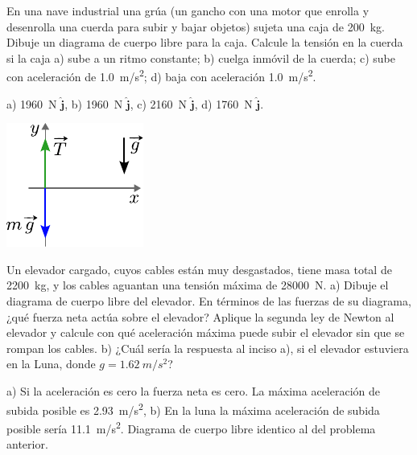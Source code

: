 \documentclass[11pt]{article}
\begin{document}
\begin{multicols}{2}
\begin{exercise}
    En una nave industrial una grúa (un gancho con una motor que enrolla y desenrolla una cuerda para subir y bajar objetos) sujeta una caja de \qty{200}{kg}. Dibuje un diagrama de cuerpo libre para la caja. Calcule la tensión en la cuerda si la caja a) sube a un ritmo constante; b) cuelga inmóvil de la cuerda; c) sube con aceleración de \qty{1.0}{m/s^2}; d) baja con aceleración \qty{1.0}{m/s^2}.
\end{exercise}
\begin{solution}
    a) \qty{1960}{N} $\hat{\bm{j}}$, b) \qty{1960}{N} $\hat{\bm{j}}$, c) \qty{2160}{N} $\hat{\bm{j}}$, d) \qty{1760}{N} $\hat{\bm{j}}$.
\begin{center}
    \includegraphics[scale=1.2]{figs/prob-06.pdf}
\end{center}
\end{solution}
\end{multicols}

\begin{multicols}{2}
\begin{exercise}
    Un elevador cargado, cuyos cables están muy desgastados, tiene masa total de \qty{2200}{kg}, y los cables aguantan una tensión máxima de \qty{28000}{N}. a) Dibuje el diagrama de cuerpo libre del elevador. En términos de las fuerzas de su diagrama, ¿qué fuerza neta actúa sobre el elevador? Aplique la segunda ley de Newton al elevador y calcule con qué aceleración máxima puede subir el elevador sin que se rompan los cables. b) ¿Cuál sería la respuesta al inciso a), si el elevador estuviera en la Luna, donde $g = \qty{1.62}{m/s^2}$?
\end{exercise}
\begin{solution}
    a) Si la aceleración es cero la fuerza neta es cero. La máxima aceleración de subida posible es \qty{2.93}{m/s^2}, b) En la luna la máxima aceleración de subida posible sería \qty{11.1}{m/s^2}. Diagrama de cuerpo libre identico al del problema anterior.
\end{solution}
\end{multicols}
\end{document}
